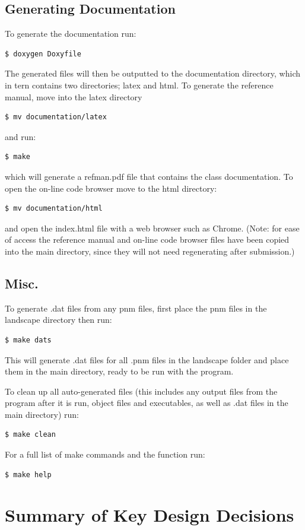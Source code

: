 \subsection{Generating Documentation}
To generate the documentation run:
\begin{lstlisting}[language=bash]
$ doxygen Doxyfile
\end{lstlisting}
The generated files will then be outputted to the documentation directory, which in tern contains two directories; latex and html. To generate the reference manual, move into the latex directory
\begin{lstlisting}[language=bash]
$ mv documentation/latex
\end{lstlisting}
and run:
\begin{lstlisting}[language=bash]
$ make
\end{lstlisting}
which will generate a refman.pdf file that contains the class documentation. To open the on-line code browser move to the html directory:
 \begin{lstlisting}[language=bash]
$ mv documentation/html
\end{lstlisting}
and open the index.html file with a web browser such as Chrome.
(Note: for ease of access the reference manual and on-line code browser files have been copied into the main directory, since they will not need regenerating after submission.)

\subsection{Misc.}
To generate .dat files from any pnm files, first place the pnm files in the landscape directory then run:

\begin{lstlisting}[language=bash]
$ make dats
\end{lstlisting}
This will generate .dat files for all .pnm files in the landscape folder and place them in the main directory, ready to be run with the program. 


To clean up all auto-generated files (this includes any output files from the program after it is run, object files and executables, as well as .dat files in the main directory) run:
\begin{lstlisting}[language=bash]
$ make clean
\end{lstlisting}


For a full list of make commands and the function run:
\begin{lstlisting}[language=bash]
$ make help
\end{lstlisting}


\section{Summary of Key Design Decisions}


